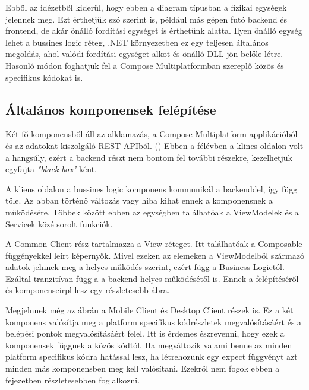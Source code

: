 Ebből az idézetből kiderül, hogy ebben a diagram típusban a fizikai egységek jelennek meg.
Ezt érthetjük szó szerint is, például más gépen futó backend és frontend, de akár önálló fordítási egységet is érthetünk alatta.
Ilyen önálló egység lehet a bussines logic réteg, .NET környezetben ez egy teljesen általános megoldás, ahol valódi fordítási egységet alkot és önálló DLL jön belőle létre.
Hasonló módon foghatjuk fel a Compose Multiplatformban szereplő közös és specifikus kódokat is.

\subsection{Általános komponensek felépítése}

Két fő komponensből áll az alklamazás, a Compose Multiplatform applikációból és az adatokat kiszolgáló REST APIból. ()
Ebben a félévben a klines oldalon volt a hangsúly, ezért a backend részt nem bontom fel további részekre, kezelhetjük egyfajta  \emph{"black box"}-ként.

A kliens oldalon a bussines logic komponens kommunikál a backenddel, így függ tőle. Az abban történő változás vagy hiba kihat ennek a komponensnek a működésére.
Többek között ebben az egységben találhatóak a ViewModelek és a Servicek közé sorolt funkciók.

A Common Client rész tartalmazza a View réteget.
Itt találhatóak a Composable függényekkel leírt képernyők.
Mivel ezeken az elemeken a ViewModelből származó adatok jelnnek meg a helyes működés szerint, ezért függ a Business Logictól. 
Ezáltal tranzitívan függ a a backend helyes működésétől is. 
Ennek a felépítéséről és komponenseirpl lesz egy részletesebb ábra.

Megjelnnek még az ábrán a Mobile Client és Desktop Client részek is.
Ez a két komponens valósítja meg a platform specifikus kódrészletek megvalósításáért és a belépési pontok megvalósításáért felel.
Itt is érdemes észrevenni, hogy ezek a komponensek függnek a közös kódtól.
Ha megváltozik valami benne az minden platform specifikus kódra hatással lesz, ha létrehozunk egy expect függvényt azt minden más komponensben meg kell valósítani.
Ezekről nem fogok ebben a fejezetben részletesebben foglalkozni.


